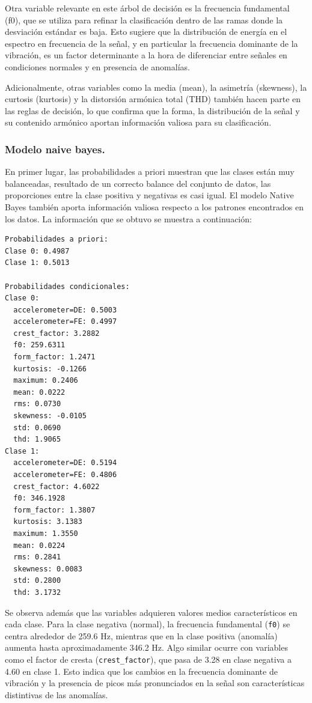\documentclass[11pt,a4paper,spanish]{book}
\numberwithin{equation}{chapter}
\numberwithin{figure}{chapter}
\begin{document}
Otra variable relevante en este árbol de decisión es la frecuencia fundamental (f0), que se utiliza para refinar la clasificación dentro de las ramas donde la desviación estándar es baja. Esto sugiere que la distribución de energía en el espectro en frecuencia de la señal, y en particular la frecuencia dominante de la vibración, es un factor determinante a la hora de diferenciar entre señales en condiciones normales y en presencia de anomalías. 


Adicionalmente, otras variables como la media (mean), la asimetría (skewness), la curtosis (kurtosis) y la distorsión armónica total (THD) también hacen parte en las reglas de decisión, lo que confirma que la forma, la distribución de la señal y su contenido armónico aportan información valiosa para su clasificación.



\subsubsection{Modelo naive bayes.}

En primer lugar, las probabilidades a priori muestran que las clases están muy balanceadas, resultado de un correcto balance del conjunto de datos, las proporciones entre la clase positiva y negativas es casi igual. 
El modelo Native Bayes también aporta información valiosa respecto a los patrones encontrados en los datos. La información que se obtuvo se muestra a continuación:  


\vspace{5mm}
\begin{lstlisting}[language={}, basicstyle=\ttfamily\footnotesize\color{black}, frame=lines]
Probabilidades a priori:
Clase 0: 0.4987
Clase 1: 0.5013

Probabilidades condicionales:
Clase 0:
  accelerometer=DE: 0.5003
  accelerometer=FE: 0.4997
  crest_factor: 3.2882
  f0: 259.6311
  form_factor: 1.2471
  kurtosis: -0.1266
  maximum: 0.2406
  mean: 0.0222
  rms: 0.0730
  skewness: -0.0105
  std: 0.0690
  thd: 1.9065
Clase 1:
  accelerometer=DE: 0.5194
  accelerometer=FE: 0.4806
  crest_factor: 4.6022
  f0: 346.1928
  form_factor: 1.3807
  kurtosis: 3.1383
  maximum: 1.3550
  mean: 0.0224
  rms: 0.2841
  skewness: 0.0083
  std: 0.2800
  thd: 3.1732
\end{lstlisting}



Se observa además que las variables adquieren valores medios característicos en cada clase. Para la clase negativa (normal), la frecuencia fundamental (\lstinline|f0|) se centra alrededor de 259.6 Hz, mientras que en la clase positiva (anomalía) aumenta hasta aproximadamente 346.2 Hz. 
Algo similar ocurre con variables como el factor de cresta (\lstinline|crest_factor|), que pasa de 3.28 en clase negativa a 4.60 en clase 1. Esto indica que los cambios en la frecuencia dominante de vibración y la  presencia de picos más pronunciados en la señal son características distintivas de las anomalías.
\end{document}
